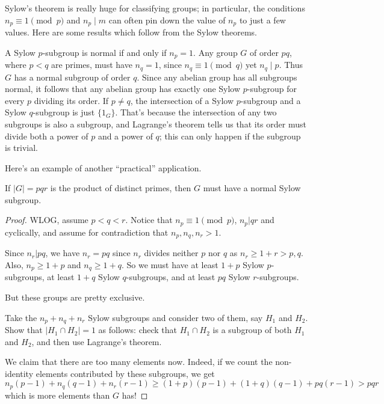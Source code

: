 Sylow's theorem is really huge for classifying groups;
in particular, the conditions $n_p \equiv 1 \pmod p$ and $n_p \mid m$
can often pin down the value of $n_p$ to just a few values.
Here are some results which follow from the Sylow theorems.
\begin{itemize}
	\ii A Sylow $p$-subgroup is normal if and only if $n_p = 1$.
	\ii Any group $G$ of order $pq$, where $p < q$ are primes,
	must have $n_q = 1$, since $n_q \equiv 1 \pmod q$ yet $n_q \mid p$.
	Thus $G$ has a normal subgroup of order $q$.
	\ii Since any abelian group has all subgroups normal,
	it follows that any abelian group has exactly one Sylow $p$-subgroup
	for every $p$ dividing its order.
	\ii If $p \neq q$, the intersection of a Sylow $p$-subgroup and a Sylow $q$-subgroup is just $\{1_G\}$.
	That's because the intersection of any two subgroups is also a subgroup,
	and Lagrange's theorem tells us that its order must divide both a power of $p$
	and a power of $q$; this can only happen if the subgroup is trivial.
\end{itemize}

Here's an example of another ``practical'' application.
\begin{proposition}
	If $\left\lvert G \right\rvert = pqr$ is the product of distinct primes,
	then $G$ must have a normal Sylow subgroup.
\end{proposition}
\begin{proof}
	WLOG, assume $p<q<r$.  Notice that $n_p \equiv 1 \pmod p$, $n_p | qr$ and cyclically, and assume for contradiction that $n_p, n_q, n_r > 1$.

	Since $n_r | pq$, we have $n_r = pq$ since $n_r$ divides neither $p$ nor $q$ as $n_r \ge 1 + r > p,q$.  Also, $n_p \ge 1+p$ and $n_q \ge 1+q$.
	So we must have at least $1+p$ Sylow $p$-subgroups,
	at least $1+q$ Sylow $q$-subgroups, and at least $pq$ Sylow $r$-subgroups.

	But these groups are pretty exclusive.
	\begin{ques}
		Take the $n_p+n_q+n_r$ Sylow subgroups and consider two of them,
		say $H_1$ and $H_2$.
		Show that $\left\lvert H_1 \cap H_2 \right\rvert = 1$
		as follows:
		check that $H_1 \cap H_2$ is a subgroup of both $H_1$ and $H_2$,
		and then use Lagrange's theorem.
	\end{ques}

	We claim that there are too many elements now.
	Indeed, if we count the non-identity elements contributed by these subgroups, we get
	\[ n_p(p-1) + n_q(q-1) + n_r(r-1)
		\ge (1+p)(p-1) + (1+q)(q-1) + pq(r-1) > pqr
	\]
	which is more elements than $G$ has!
\end{proof}



